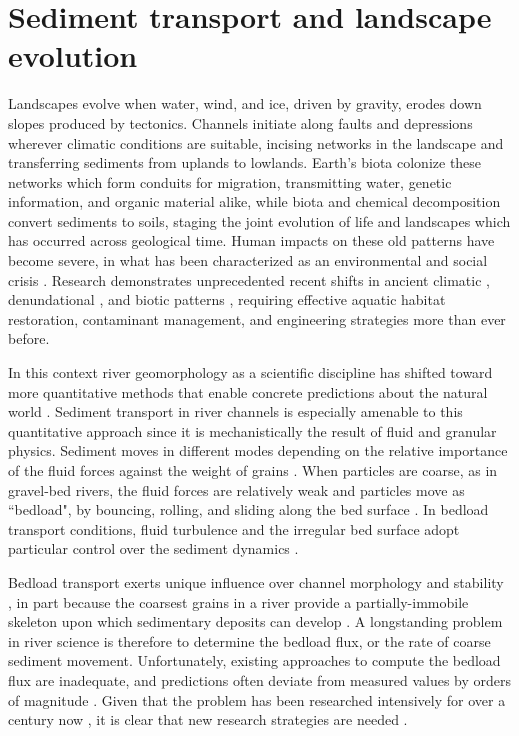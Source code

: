 
\chapter{Sediment transport and landscape evolution}
\label{ch:Introduction}

Landscapes evolve when water, wind, and ice, driven by gravity, erodes down slopes produced by tectonics.
Channels initiate along faults and depressions wherever climatic conditions are suitable, incising networks in the landscape and transferring sediments from uplands to lowlands.
Earth's biota colonize these networks which form conduits for migration, transmitting water, genetic information, and organic material alike, while biota and chemical decomposition convert sediments to soils, staging the joint evolution of life and landscapes which has occurred across geological time.
Human impacts on these old patterns have become severe, in what has been characterized as an environmental and social crisis \citep{Slaymaker2021}.
Research demonstrates unprecedented recent shifts in ancient climatic \citep{Sivan2004,Slater2021}, denundational \citep{Hooke2000,Szabo2010}, and biotic patterns \citep{Walther2002,Willis2009}, requiring effective aquatic habitat restoration, contaminant management, and engineering strategies more than ever before.

In this context river geomorphology as a scientific discipline has shifted toward more quantitative methods that enable concrete predictions about the natural world \citep{Church2005,Church2010}.
Sediment transport in river channels is especially amenable to this quantitative approach since it is mechanistically the result of fluid and granular physics.
Sediment moves in different modes depending on the relative importance of the fluid forces against the weight of grains \citep{Bagnold1956}.
When particles are coarse, as in gravel-bed rivers, the fluid forces are relatively weak and particles move as ``bedload", by bouncing, rolling, and sliding along the bed surface \citep{Kalinske1947}. In bedload transport conditions, fluid turbulence and the irregular bed surface adopt particular control over the sediment dynamics \citep{Ferreira2015}.

Bedload transport exerts unique influence over channel morphology and stability \citep{Church2006,Recking2016}, in part because the coarsest grains in a river provide a partially-immobile skeleton upon which sedimentary deposits can develop \citep{Hassan2008, Eaton2020}.
A longstanding problem in river science is therefore to determine the bedload flux, or the rate of coarse sediment movement.
Unfortunately, existing approaches to compute the bedload flux are inadequate, and predictions often deviate from measured values by orders of magnitude \citep{Gomez1989, Barry2004, Bathurst2007a, Recking2012}.
Given that the problem has been researched intensively for over a century now \citep{Gilbert1914}, it is clear that new research strategies are needed \citep{Ancey2020a,Ancey2020}.


